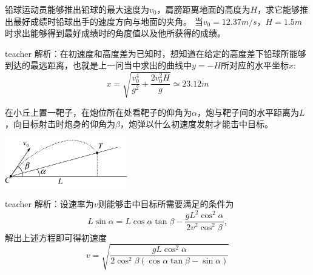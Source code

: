 \begin{example}
铅球运动员能够推出铅球的最大速度为$v_0$，肩膀距离地面的高度为$H$，求它能够推出最好成绩时铅球出手的速度方向与地面的夹角。
当$v_0 = 12.37 \unit{m/s}$，$H = 1.5\unit{m}$时求出能够得到最好成绩时的角度值以及他所获得的成绩。
\begin{taggedblock}{teacher}
\newline
解析：在初速度和高度差为已知时，想知道在给定的高度差下铅球所能够到达的最远距离，也就是上一问当中求出的曲线中$y=-H$所对应的水平坐标$x$:
\[
x = \sqrt{\frac{v_0^4}{g^2}+\frac{2v_0^2H}{g}}\simeq 23.12\unit{m}
\]
\end{taggedblock}
\end{example}

\begin{example}
在小丘上置一靶子，在炮位所在处看靶子的仰角为$\alpha$，炮与靶子间的水平距离为$L$，向目标射击时炮身的仰角为$\beta$，炮弹以什么初速度发射才能击中目标。
\begin{flushright}
\includegraphics[width = 0.4\textwidth]{images/motion-problem-31.pdf} 
\end{flushright}
\begin{taggedblock}{teacher}
\noindent
解析：设速率为$v$则能够击中目标所需要满足的条件为
\[
L\sin\alpha = L\cos\alpha\tan\beta-\frac{gL^2\cos^2\alpha}{2v^2\cos^2\beta},
\]
解出上述方程即可得初速度
\[
v=\sqrt{\frac{gL\cos^2\alpha}{2\cos^2\beta(\cos\alpha\tan\beta-\sin\alpha)}}
\]
\end{taggedblock}
\end{example}



